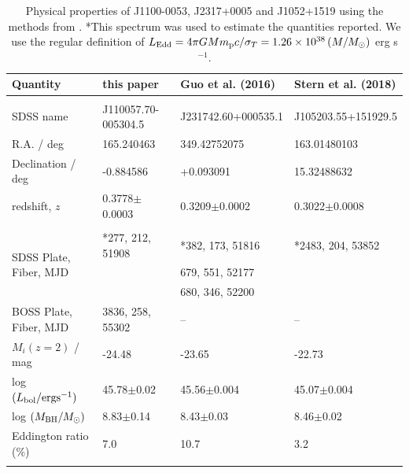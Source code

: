 \documentclass[a4paper,fleqn,usenatbib]{mnras}
\begin{document}
\begin{table}
 \centering
 \begin{tabular}{l l l l}
  \hline \hline 
 Quantity                                          &     this paper                       &  Guo et al. (2016)              & Stern et al. (2018) \\
 \hline 
    &&\\
    SDSS name                                       &    J110057.70-005304.5    &  J231742.60+000535.1    & J105203.55+151929.5 \\
    R.A. / deg                                        &  165.240463                       &  349.42752075                &   163.01480103  \\
    Declination / deg                            &   -0.884586                        &   +0.093091                    & 15.32488632 \\
   redshift, $z$                                    &   0.3778$\pm$0.0003        & 0.3209$\pm$0.0002       & 0.3022$\pm$0.0008\\
    &&\\ 
    \multirow{3}{*}{SDSS Plate, Fiber, MJD }  &  	*277, 212,   51908    &  *382, 173, 51816         & *2483, 204, 53852 \\
    &                                           & 679, 551, 52177              & \\    
    &                                           & 680, 346, 52200             & \\
    BOSS Plate, Fiber, MJD                 & 	3836, 258, 55302          	    &    --                                & -- \\
    $M_{i}(z=2)$  / mag                          &   -24.48                             & -23.65                           & -22.73 \\
    log $(L_{\rm bol} / {\rm erg s}^{-1}) $  &   45.78$\pm$0.02               & 45.56$\pm$0.004      & 45.07$\pm$0.004 \\
    log $(M_{\rm BH} / M_{\odot})  $           &  8.83$\pm$0.14                & 8.43$\pm$0.03           & 8.46$\pm$0.02 \\
    Eddington ratio  (\%)                        &        7.0                         &  10.7                           &  3.2     \\ 
    &&\\
    \hline \hline 
  \end{tabular}
  \caption{Physical properties of J1100-0053, J2317+0005 and J1052+1519 using the
    methods from \citet{Shen2011}. *This spectrum was used to estimate
    the quantities reported.  We use the regular definition of $L_{\rm
      Edd} = 4 \pi G M m_{\rm p} c /\sigma_{T} =
    1.26\times10^{38}\left (M/M_{\odot} \right )$ erg s$^{-1}$.} 
 \label{tab:Shen_props}
\end{table}
\end{document}
